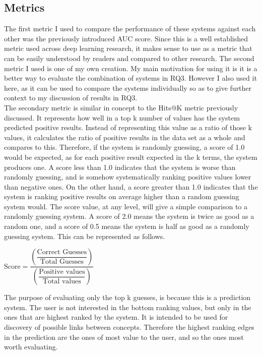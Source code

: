 \documentclass{l4proj}
\begin{document}
\subsection{Metrics}

The first metric I used to compare the performance of these systems against each other was the previously introduced AUC score. Since this is a well established metric used across deep learning research, it makes sense to use as a metric that can be easily understood by readers and compared to other research. The second metric I used is one of my own creation. My main motivation for using it is it is a better way to evaluate the combination of systems in RQ3. However I also used it here, as it can be used to compare the systems individually so as to give further context to my discussion of results in RQ3. \\ 

The secondary metric is similar in concept to the Hits@K metric previously discussed. It represents how well in a top k number of values has the system predicted positive results. Instead of representing this value as a ratio of those k values, it calculates the ratio of positive results in the data set as a whole and compares to this. Therefore, if the system is randomly guessing, a score of 1.0 would be expected, as for each positive result expected in the k terms, the system produces one. A score less than 1.0 indicates that the system is worse than randomly guessing, and is somehow systematically ranking positive values lower than negative ones. On the other hand, a score greater than 1.0 indicates that the system is ranking positive results on average higher than a random guessing system would. The score value, at any level, will give a simple comparison to a randomly guessing system. A score of 2.0 means the system is twice as good as a random one, and a score of 0.5 means the system is half as good as a randomly guessing system. This can be represented as follows.\\

\begin{center}
    $\text{Score} = \dfrac{\left ( \dfrac{\text{Correct Guesses}}{\text{Total Guesses}}\right )}{\left ( \dfrac{\text{Positive values}}{\text{Total values}}\right )}$ 
\end{center}

The purpose of evaluating only the top k guesses, is because this is a prediction system. The user is not interested in the bottom ranking values, but only in the ones that are highest ranked by the system. It is intended to be used for discovery of possible links between concepts. Therefore the highest ranking edges in the prediction are the ones of most value to the user, and so the ones most worth evaluating. \\
\end{document}
